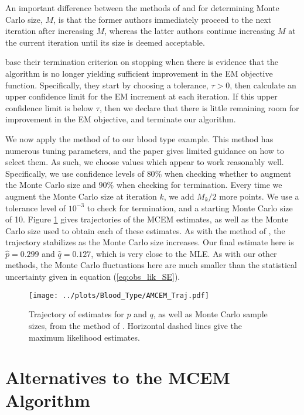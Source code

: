 \documentclass[ss]{imsart}
\theoremstyle{plain}
\theoremstyle{definition}
\theoremstyle{remark}
\begin{document}
An important difference between the methods of \citet{Boo99} and \citeauthor{Caf05} for determining Monte Carlo size, $M$, is that the former authors immediately proceed to the next iteration after increasing $M$, whereas the latter authors continue increasing $M$ at the current iteration until its size is deemed acceptable.

\citeauthor{Caf05} base their termination criterion on stopping when there is evidence that the algorithm is no longer yielding sufficient improvement in the EM objective function. Specifically, they start by choosing a tolerance, $\tau>0$, then calculate an upper confidence limit for the EM increment at each iteration. If this upper confidence limit is below $\tau$, then we declare that there is little remaining room for improvement in the EM objective, and terminate our algorithm.

We now apply the method of \citeauthor{Caf05} to our blood type example. This method has numerous tuning parameters, and the paper gives limited guidance on how to select them. As such, we choose values which appear to work reasonably well. Specifically, we use confidence levels of $80\%$ when checking whether to augment the Monte Carlo size and $90\%$ when checking for termination. Every time we augment the Monte Carlo size at iteration $k$, we add $M_k/2$ more points. We use a tolerance level of $10^{-3}$ to check for termination, and a starting Monte Carlo size of 10. Figure \ref{fig:blood_AMCEM_traj} gives trajectories of the MCEM estimates, as well as the Monte Carlo size used to obtain each of these estimates. As with the method of \citet{Boo99}, the trajectory stabilizes as the Monte Carlo size increases. Our final estimate here is $\hat{p} = 0.299$ and $\hat{q} = 0.127$, which is very close to the MLE. As with our other methods, the Monte Carlo fluctuations here are much smaller than the statistical uncertainty given in equation (\ref{eq:obs_lik_SE}).

\begin{figure}
    \centering
    \caption{Trajectory of estimates for $p$ and $q$, as well as Monte Carlo sample sizes, from the method of \citeauthor{Caf05}. Horizontal dashed lines give the maximum likelihood estimates.}
    \label{fig:blood_AMCEM_traj}
    \texttt{[image: ../plots/Blood\_Type/AMCEM\_Traj.pdf]}   
\end{figure}

\section{Alternatives to the MCEM Algorithm}
\label{sec:alternatives}
\end{document}
